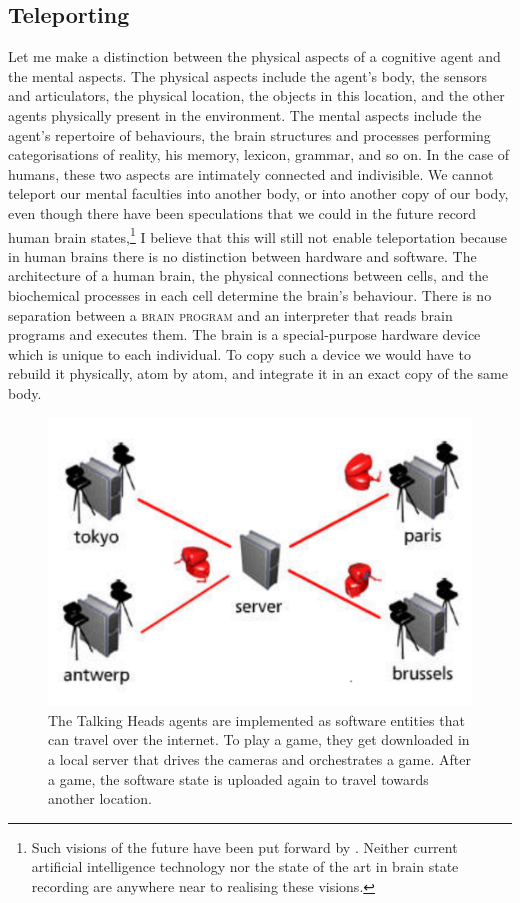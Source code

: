 \subsection{Teleporting}

Let me make a distinction between the physical aspects of 
a cognitive agent and the mental aspects. The physical aspects include the 
agent's body, the sensors and articulators, 
the physical location, the objects in this location, and the other
agents physically present in the environment. The 
mental aspects include the agent's repertoire of behaviours, 
the brain structures and processes
performing categorisations of reality, his
memory, lexicon, grammar, and so on. 
In the case of humans, these two aspects are intimately 
connected and indivisible. We cannot teleport our mental 
faculties into another body, or into another copy of 
our body, even though there have been speculations that 
we could in the future record human 
brain states,\footnote{Such visions of the future have been put forward
by \cite{Moravec:1995}. Neither current artificial intelligence technology nor
the state of the art in brain state recording are anywhere 
near to realising these visions.}
I believe that this will still not enable teleportation
because in human brains there is no distinction between 
hardware and software. The architecture of a human brain, 
the physical connections between cells, and the 
biochemical processes in each cell determine the brain's behaviour.
There is no separation between a {\scshape brain program} and
an interpreter that reads brain programs and 
executes them. The brain is a special-purpose 
hardware device which is unique to each individual. 
To copy such a device we would have to rebuild it physically,
atom by atom, and integrate it in an exact copy of the 
same body. 


\begin{figure}[htbp]
  \centerline{\includegraphics[width=.50\textwidth]{chap1/figs/teleportation.pdf}}
\caption{The Talking Heads agents are implemented as software entities that can travel over the internet. 
To play a game, they get downloaded in a local server that drives the cameras and orchestrates a game. After a game, the software 
state is uploaded again to travel towards another location.}
\label{f:teleport}
\end{figure}

